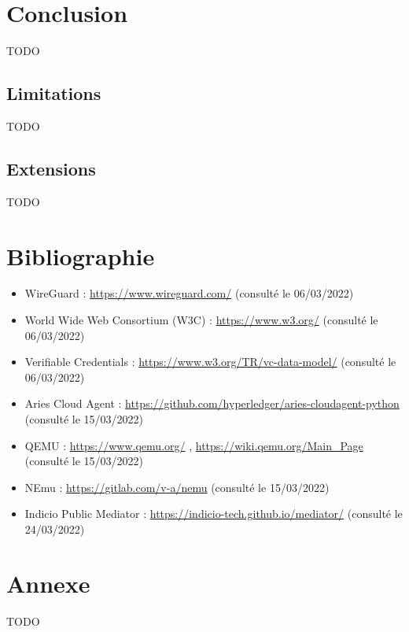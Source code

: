\documentclass[12pt, openany]{report}
\begin{document}
\section{Conclusion}
\noindent 
\begin{flushleft}
TODO
\end{flushleft}
\subsection{Limitations}
\noindent 
\begin{flushleft}
TODO
\end{flushleft}
\subsection{Extensions}
\noindent 
\begin{flushleft}
TODO
\end{flushleft}

\section{Bibliographie}
\noindent 
\begin{itemize}

\item WireGuard : \url{https://www.wireguard.com/} (consulté le 06/03/2022) 
\item World Wide Web Consortium (W3C) : \url{https://www.w3.org/} (consulté le 06/03/2022)
\item Verifiable Credentials : \url{https://www.w3.org/TR/vc-data-model/} (consulté le 06/03/2022) 
\item Aries Cloud Agent : \url{https://github.com/hyperledger/aries-cloudagent-python} (consulté le 15/03/2022)
\item QEMU : \url{https://www.qemu.org/} , \url{https://wiki.qemu.org/Main_Page} (consulté le 15/03/2022)
\item NEmu : \url{https://gitlab.com/v-a/nemu} (consulté le 15/03/2022)
\item Indicio Public Mediator : \url{https://indicio-tech.github.io/mediator/} (consulté le 24/03/2022)

\end{itemize}

\section{Annexe}
\noindent 
\begin{flushleft}
TODO
\end{flushleft}
\end{document}
